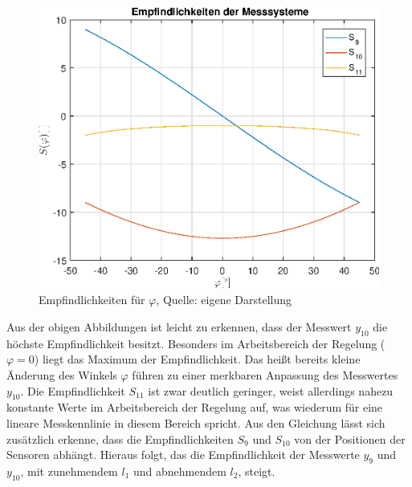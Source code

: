 \begin{figure}[h!]
\centering
\includegraphics[width=0.5\linewidth]{3_Sensorik/img/empfindlichkeit_phi}
\caption{Empfindlichkeiten für $\varphi$, Quelle: eigene Darstellung}
\end{figure}
Aus der obigen Abbildungen ist leicht zu erkennen, dass der Messwert $y_{10}$ die höchste Empfindlichkeit besitzt. Besonders im Arbeitsbereich der Regelung ($\varphi=0$) liegt das Maximum der Empfindlichkeit. Das heißt bereits kleine Änderung des Winkels $\varphi$ führen zu einer merkbaren Anpassung des Messwertes $y_{10}$. Die Empfindlichkeit $S_{11}$ ist zwar deutlich geringer, weist allerdings nahezu konstante Werte im Arbeitsbereich der Regelung auf, was wiederum für eine lineare Messkennlinie in diesem Bereich spricht. Aus den Gleichung lässt sich zusätzlich erkenne, dass die Empfindlichkeiten $S_9$ und $S_{10}$ von der Positionen der Sensoren abhängt. Hieraus folgt, das die Empfindlichkeit der Messwerte $y_9$ und $y_{10}$, mit zunehmendem $l_1$ und abnehmendem $l_2$, steigt.

